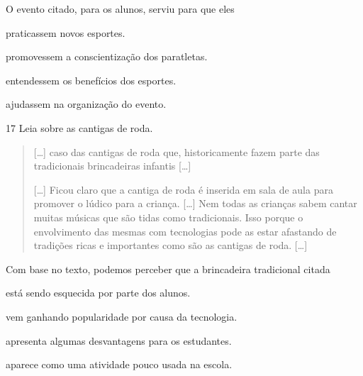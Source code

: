 \noindent{}O evento citado, para os alunos, serviu para que eles

\begin{escolha}
\item praticassem novos esportes.

\item promovessem a conscientização dos paratletas.

\item entendessem os benefícios dos esportes.

\item ajudassem na organização do evento.
\end{escolha}


\num{17} Leia sobre as cantigas de roda.
\begin{quote}
  {[}\ldots{}{]} caso das cantigas de roda que, historicamente fazem parte
  das tradicionais brincadeiras infantis {[}\ldots{}{]}

{[}\ldots{}{]} Ficou claro que a cantiga de roda é inserida em sala de aula
para promover o lúdico para a criança. {[}\ldots{}{]} Nem todas as crianças
sabem cantar muitas músicas que são tidas como tradicionais. Isso porque
o envolvimento das mesmas com tecnologias pode as estar afastando de
tradições ricas e importantes como são as cantigas de roda. {[}\ldots{}{]}

\end{quote}

\noindent{}Com base no texto, podemos perceber que a brincadeira tradicional citada

\begin{escolha}
\item está sendo esquecida por parte dos alunos.

\item vem ganhando popularidade por causa da tecnologia.

\item apresenta algumas desvantagens para os estudantes.

\item aparece como uma atividade pouco usada na escola.
\end{escolha}

